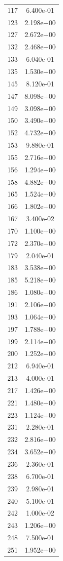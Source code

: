 \documentclass[12pt]{article}
\begin{document}
\begin{longtable}{@{}cc@{}}
117 & 6.400e-01 \\
123 & 2.198e+00 \\
127 & 2.672e+00 \\
132 & 2.468e+00 \\
133 & 6.040e-01 \\
135 & 1.530e+00 \\
145 & 8.120e-01 \\
147 & 8.098e+00 \\
149 & 3.098e+00 \\
150 & 3.490e+00 \\
152 & 4.732e+00 \\
153 & 9.880e-01 \\
155 & 2.716e+00 \\
156 & 1.294e+00 \\
158 & 4.882e+00 \\
165 & 1.524e+00 \\
166 & 1.802e+00 \\
167 & 3.400e-02 \\
170 & 1.100e+00 \\
172 & 2.370e+00 \\
179 & 2.040e-01 \\
183 & 3.538e+00 \\
185 & 5.218e+00 \\
186 & 1.080e+00 \\
191 & 2.106e+00 \\
193 & 1.064e+00 \\
197 & 1.788e+00 \\
199 & 2.114e+00 \\
200 & 1.252e+00 \\
212 & 6.940e-01 \\
213 & 4.000e-01 \\
217 & 1.426e+00 \\
221 & 1.480e+00 \\
223 & 1.124e+00 \\
231 & 2.280e-01 \\
232 & 2.816e+00 \\
234 & 3.652e+00 \\
236 & 2.360e-01 \\
238 & 6.700e-01 \\
239 & 2.980e-01 \\
240 & 5.100e-01 \\
242 & 1.000e-02 \\
243 & 1.206e+00 \\
248 & 7.500e-01 \\
251 & 1.952e+00 \\

\end{longtable}
\end{document}
